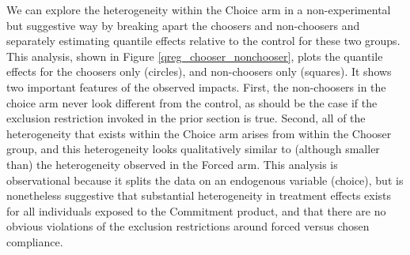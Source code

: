 \documentclass[oneside,11pt]{article}
\begin{document}
We can explore the heterogeneity within the Choice arm in a non-experimental but suggestive way by breaking apart the choosers and non-choosers and separately estimating quantile effects relative to the control for these two groups.  This analysis, shown in Figure \ref{qreg_chooser_nonchooser}, plots the quantile effects for the choosers only (circles), and non-choosers only (squares).  It shows two important features of the observed impacts.  First, the non-choosers in the choice arm never look different from the control, as should be the case if the exclusion restriction invoked in the prior section is true.  Second, all of the heterogeneity that exists within the Choice arm arises from within the Chooser group, and this heterogeneity looks qualitatively similar to (although smaller than) the heterogeneity observed in the Forced arm.  This analysis is observational because it splits the data on an endogenous variable (choice), but is nonetheless suggestive that substantial heterogeneity in treatment effects exists for all individuals exposed to the Commitment product, and that there are no obvious violations of the exclusion restrictions around forced versus chosen compliance.





\end{document}
